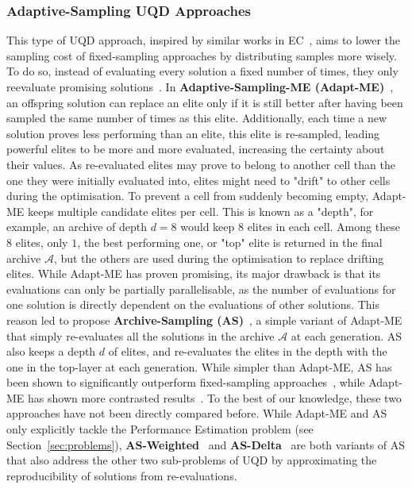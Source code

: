 \subsubsection{Adaptive-Sampling UQD Approaches} \label{sec:adaptive_sampling}
This type of UQD approach, inspired by similar works in EC~\cite{ea_adaptive, ea_adaptive_2}, aims to lower the sampling cost of fixed-sampling approaches by distributing samples more wisely. To do so, instead of evaluating every solution a fixed number of times, they only reevaluate promising solutions~\cite{adaptive, flageat2023uncertain}. 
In \textbf{Adaptive-Sampling-ME (Adapt-ME)}~\cite{adaptive}, an offspring solution can replace an elite only if it is still better after having been sampled the same number of times as this elite. 
Additionally, each time a new solution proves less performing than an elite, this elite is re-sampled, leading powerful elites to be more and more evaluated, increasing the certainty about their values. As re-evaluated elites may prove to belong to another cell than the one they were initially evaluated into, elites might need to "drift" to other cells during the optimisation. To prevent a cell from suddenly becoming empty, Adapt-ME keeps multiple candidate elites per cell. 
This is known as a "depth", for example, an archive of depth $d=8$ would keep $8$ elites in each cell. Among these $8$ elites, only $1$, the best performing one, or "top" elite is returned in the final archive $\mathcal{A}$, but the others are used during the optimisation to replace drifting elites. 
While Adapt-ME has proven promising, its major drawback is that its evaluations can only be partially parallelisable, as the number of evaluations for one solution is directly dependent on the evaluations of other solutions.
This reason led to propose \textbf{Archive-Sampling (AS)}~\cite{flageat2023uncertain}, a simple variant of Adapt-ME that simply re-evaluates all the solutions in the archive $\mathcal{A}$ at each generation. AS also keeps a depth $d$ of elites, and re-evaluates the elites in the depth with the one in the top-layer at each generation. 
While simpler than Adapt-ME, AS has been shown to significantly outperform fixed-sampling approaches~\cite{flageat2023uncertain,flageat2024exploring}, while Adapt-ME has shown more contrasted results~\cite{adaptive}. To the best of our knowledge, these two approaches have not been directly compared before. 
While Adapt-ME and AS only explicitly tackle the Performance Estimation problem (see Section~\ref{sec:problems}), \textbf{AS-Weighted}~\cite{flageat2024exploring} and \textbf{AS-Delta}~\cite{flageat2024exploring} are both variants of AS that also address the other two sub-problems of UQD by approximating the reproducibility of solutions from re-evaluations. 


